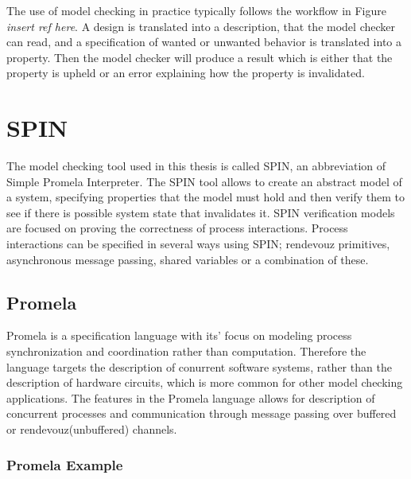 
The use of model checking in practice typically follows the workflow in Figure \textit{insert ref here}. A design is translated into a description, that the model checker can read, and a specification of wanted or unwanted behavior is translated into a property. Then the model checker will produce a result which is either that the property is upheld or an error explaining how the property is invalidated. 

\section{SPIN}

The model checking tool used in this thesis is called SPIN, an abbreviation of Simple Promela Interpreter. The SPIN tool allows to create an abstract model of a system, specifying properties that the model must hold and then verify them to see if there is possible system state that invalidates it. SPIN verification models are focused on proving the correctness of process interactions.\cite{holzmann1997model} Process interactions can be specified in several ways using SPIN; rendevouz primitives, asynchronous message passing, shared variables or a combination of these. 



\subsection{Promela}
Promela is a specification language with its' focus on modeling process synchronization and coordination rather than computation. Therefore the language targets the description of conurrent software systems, rather than the description of hardware circuits, which is more common for other model checking applications\cite{holzmann1997model}.
The features in the Promela language allows for description of concurrent processes and communication through message passing over buffered or rendevouz(unbuffered) channels.  


\subsubsection{Promela Example}


